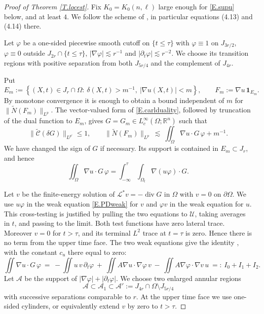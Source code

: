 \documentclass[10pt,a4paper]{amsart}
\numberwithin{equation}{section}
\DeclareMathOperator{\divg}{div}
\newcommand{\R}{\mathbb R}
\newcommand{\wt}{\widetilde}
\newcommand{\abs}[1]{\left\vert#1\right\vert}
\newcommand{\set}[1]{\left\{#1\right\}}
\newcommand{\om}{\Omega}
\newcommand{\pom}{\partial\Omega}
\newcommand{\pd}{\partial}
\newcommand{\LL}{\mathcal L}
\newcommand{\Uc}{\mathcal U}
\newcommand{\Nt}{\widetilde N}
\begin{document}
\begin{proof}[Proof of Theorem \ref{T.locest}]
Fix $K_0=K_0(n,\ell)$ large enough for \eqref{E.supu} below, and at least
$4$. We follow the scheme of \cite[Lemma 4.12]{DLP2}, in particular equations
(4.13) and (4.14) there.\medskip

Let $\varphi$ be a one-sided piecewise smooth cutoff on $\{t\le\tau\}$ with
$\varphi\equiv1$ on $J_{3r/2}$, $\varphi\equiv0$ outside
$J_{2r}\cap\{t\le\tau\}$, $\abs{\nabla\varphi}\lesssim r^{-1}$ and
$\abs{\pd_t\varphi}\lesssim r^{-2}$. We choose its transition regions with
positive separation from both $J_{5r/4}$ and the complement of $J_{4r}$.

Put
$$E_m:=\set{(X,t)\in J_r\cap\om:\ \delta(X,t)>m^{-1},\
 |\nabla u(X,t)|<m},\qquad
 F_m:=\nabla u\,\mathbf1_{E_m}.$$
By monotone convergence it is enough to obtain a bound independent of $m$ for
$\|\Nt(F_m)\|_{L^p}$. The vector-valued form of
\eqref{E.carlduality}, followed by truncation of the dual function to $E_m$,
gives $G=G_m\in L^\infty_c(\om;\R^n)$ such that
$$\|\wt{\mathcal C}(\delta G)\|_{L^{p'}}\le1,
  \qquad
  \|\Nt(F_m)\|_{L^p}
  \ \lesssim\ \iint_\om\nabla u\cdot G\,\varphi+m^{-1}.$$
We have changed the sign of $G$ if necessary. Its support is contained in
$E_m\subset J_r$, and hence
$$\iint_\om\nabla u\cdot G\,\varphi
  =\int_{-\infty}^\tau\!\!\int_{\om_t}\nabla(u\varphi)\cdot G .$$

Let $v$ be the finite-energy solution of $\LL^*v=-\divg G$ in $\om$ with
$v=0$ on $\pom$. We use $u\varphi$ in the weak equation \eqref{E.PDweak} for
$v$ and
$\varphi v$ in the weak equation for $u$. This cross-testing is justified by
pulling the two equations to $\Uc$, taking  averages in $t$, and passing
to the limit. Both test functions have zero lateral trace. Moreover $v=0$ for
$t>\tau$, and its terminal $L^2$ trace at $t=\tau$ is zero. Hence there is no
term from the upper time face. The two weak equations give the identity
\cite[(4.16)]{DLP2}, with the constant $c_u$ there equal to zero:
$$\iint\nabla u\cdot G\,\varphi
  \ =\ -\iint u\,v\,\pd_t\varphi
  \ +\ \iint A\nabla u\cdot\nabla\varphi\,v
  \ -\ \iint A\nabla\varphi\cdot\nabla v\,u
  \ =:\ I_0+I_1+I_2 .$$
Let $\mathcal A$ be the support of
$|\nabla\varphi|+|\pd_t\varphi|$. We choose two enlarged annular regions
$$\mathcal A\subset\mathcal A_1\subset\mathcal A'
 :=J_{4r}\cap\om\setminus J_{5r/4}$$
with successive separations comparable to $r$. At the upper time face we use
one-sided cylinders, or equivalently extend $v$ by zero to $t>\tau$.


\end{proof}
\end{document}
